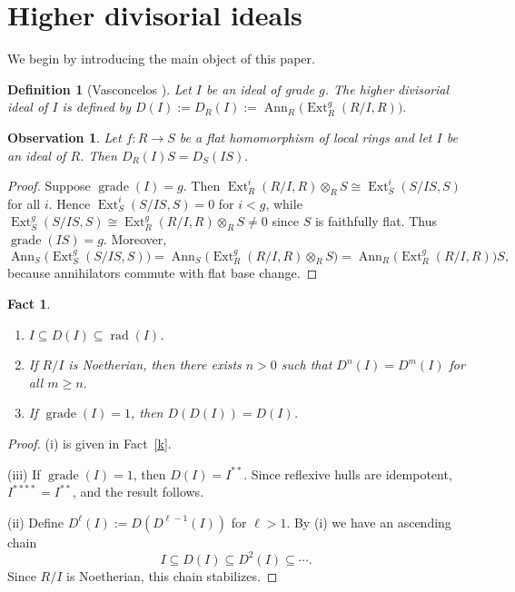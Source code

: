 \documentclass[11pt,a4paper]{amsart}
\numberwithin{equation}{section}
\newtheorem{definition}[theorem]{Definition}
\newtheorem{fact}[theorem]{Fact}
\newtheorem{observation}[theorem]{Observation}
\DeclareMathOperator{\grade}{grade}
\DeclareMathOperator{\Ann}{Ann}\DeclareMathOperator{\ann}{Ann}
\DeclareMathOperator{\rad}{rad}
\DeclareMathOperator{\Ext}{Ext}
\begin{document}
	\maketitle



\section{Higher divisorial ideals}

We begin by introducing the main object of this paper.

\begin{definition}[Vasconcelos \cite{wol}]
	Let $I$ be an ideal of grade $g$. The \emph{higher divisorial ideal} of $I$ is defined by
	\(
	D(I):=D_R(I):=\Ann_R\!\big(\Ext^{g}_R(R/I,R)\big).
	\)
\end{definition}

\begin{observation}
	Let $f:R\to S$ be a flat homomorphism of local rings and let $I$ be an ideal of $R$. Then
	\(
	D_R(I)S = D_S(IS).
	\)
\end{observation}

\begin{proof}
	Suppose $\grade(I)=g$. Then
	\(
	\Ext^i_R(R/I,R)\otimes_R S \cong \Ext^i_S(S/IS,S)
	\)
	for all $i$. Hence $\Ext^i_S(S/IS,S)=0$ for $i<g$, while
	\(
	\Ext^{g}_S(S/IS,S)\cong \Ext^{g}_R(R/I,R)\otimes_R S \neq 0
	\)
	since $S$ is faithfully flat. Thus $\grade(IS)=g$. Moreover,
	\[
	\Ann_S\!\big(\Ext^{g}_S(S/IS,S)\big)
	= \Ann_S\!\big(\Ext^{g}_R(R/I,R)\otimes_R S\big)
	= \Ann_R\!\big(\Ext^{g}_R(R/I,R)\big)S,
	\]
	because annihilators commute with flat base change.
\end{proof}

\begin{fact}\label{ddd}
	\begin{enumerate}
		\item[(i)] $I \subseteq D(I) \subseteq \rad(I)$.
		\item[(ii)] If $R/I$ is Noetherian, then there exists $n>0$ such that
		$D^n(I)=D^m(I)$ for all $m\ge n$.
		\item[(iii)] If $\grade(I)=1$, then $D(D(I))=D(I)$.
	\end{enumerate}
\end{fact}

\begin{proof}
	(i) is given in Fact~\ref{k}.  
	
	(iii) If $\grade(I)=1$, then $D(I)=I^{**}$. Since reflexive hulls are idempotent, $I^{****}=I^{**}$, and the result follows.
	
	(ii) Define $D^{\ell}(I):=D(D^{\ell-1}(I))$ for $\ell>1$. By (i) we have an ascending chain
	\[
	I \subseteq D(I)\subseteq D^2(I)\subseteq \cdots.
	\]
	Since $R/I$ is Noetherian, this chain stabilizes.
\end{proof}
\end{document}
